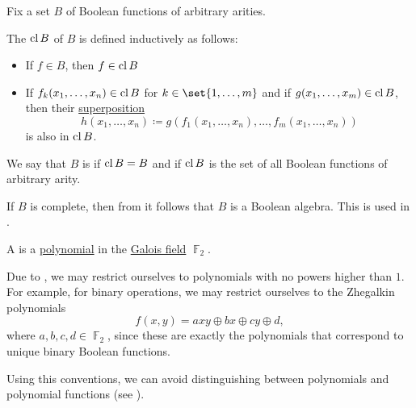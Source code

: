 \begin{definition}\label{def:boolean_closure}
  Fix a set \( B \) of Boolean functions of arbitrary arities.

  The  \( \operatorname{cl}{B} \) of \( B \) is defined inductively as follows:
  \begin{itemize}
    \item If \( f \in B \), then \( f \in \operatorname{cl}{B} \)
    \item If \( f_k(x_1, \ldots, x_n) \in \operatorname{cl}{B} \) for \( k \in \set{ 1, \ldots, m } \) and if \( g(x_1, \ldots, x_m) \in \operatorname{cl}{B} \), then their \hyperref[def:function/superposition]{superposition}
    \begin{equation*}
      h(x_1, \ldots, x_n) \coloneqq g(f_1(x_1, \ldots, x_n), \ldots, f_m(x_1, \ldots, x_n))
    \end{equation*}
    is also in \( \operatorname{cl}{B} \).
  \end{itemize}

  We say that \( B \) is  if \( \operatorname{cl}{B} = B \) and  if \( \operatorname{cl}{B} \) is the set of all Boolean functions of arbitrary arity.

  If \( B \) is complete, then from  it follows that \( B \) is a Boolean algebra. This is used in .
\end{definition}

\begin{definition}\label{def:zhegalkin_polynomial}
  A  is a \hyperref[def:polynomial]{polynomial} in the \hyperref[thm:galois_field_existence]{Galois field} \( \BbbF_2 \).

  Due to , we may restrict ourselves to polynomials with no powers higher than \( 1 \). For example, for binary operations, we may restrict ourselves to the Zhegalkin polynomials
  \begin{equation}\label{eq:def:zhegalkin_polynomial/binary_polynomial}
    f(x, y) = axy \oplus bx \oplus cy \oplus d,
  \end{equation}
  where \( a, b, c, d \in \BbbF_2 \), since these are exactly the polynomials that correspond to unique binary Boolean functions.

  Using this conventions, we can avoid distinguishing between polynomials and polynomial functions (see ).
\end{definition}

